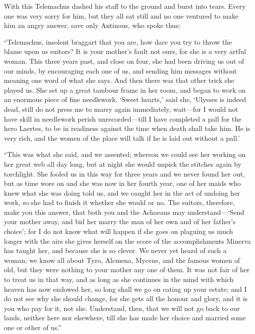 With this Telemachus dashed his staff to the ground and burst into tears. Every
one was very sorry for him, but they all sat still and no one ventured to make
him an angry answer, save only Antinous, who spoke thus:

“Telemachus, insolent braggart that you are, how dare you try to throw the
blame upon us suitors? It is your mother’s fault not ours, for she is a very
artful woman. This three years past, and close on four, she had been driving us
out of our minds, by encouraging each one of us, and sending him messages
without meaning one word of what she says. And then there was that other trick
she played us. She set up a great tambour frame in her room, and began to work
on an enormous piece of fine needlework. ‘Sweet hearts,’ said she, ‘Ulysses is
indeed dead, still do not press me to marry again immediately, wait—for I would
not have skill in needlework perish unrecorded—till I have completed a pall for
the hero Laertes, to be in readiness against the time when death shall take
him. He is very rich, and the women of the place will talk if he is laid out
without a pall.’

“This was what she said, and we assented; whereon we could see her working on
her great web all day long, but at night she would unpick the stitches again by
torchlight. She fooled us in this way for three years and we never found her
out, but as time wore on and she was now in her fourth year, one of her maids
who knew what she was doing told us, and we caught her in the act of undoing
her work, so she had to finish it whether she would or no. The suitors,
therefore, make you this answer, that both you and the Achaeans may
understand—‘Send your mother away, and bid her marry the man of her own and of
her father’s choice’; for I do not know what will happen if she goes on
plaguing us much longer with the airs she gives herself on the score of the
accomplishments Minerva has taught her, and because she is so clever. We never
yet heard of such a woman; we know all about Tyro, Alcmena, Mycene, and the
famous women of old, but they were nothing to your mother any one of them. It
was not fair of her to treat us in that way, and as long as she continues in
the mind with which heaven has now endowed her, so long shall we go on eating
up your estate; and I do not see why she should change, for she gets all the
honour and glory, and it is you who pay for it, not she. Understand, then, that
we will not go back to our lands, neither here nor elsewhere, till she has made
her choice and married some one or other of us.”


